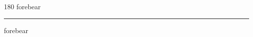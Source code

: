 
\begin{frame}
\begin{center}
\begin{turn}{180}
{\fontsize{2.5cm}{1em}\selectfont forebear}
\end{turn}
\vspace{1em}\par  
\hrule
\vspace{1em}\par  
{\fontsize{2.5cm}{1em}\selectfont forebear}
\end{center}
\end{frame}
